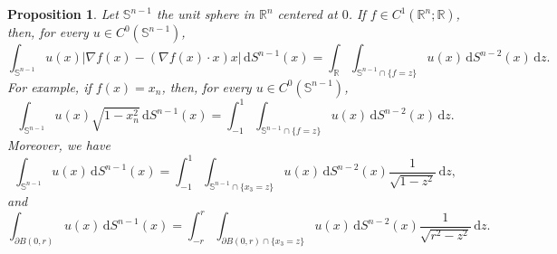 \documentclass[a4paper,9pt]{amsart}
\newcommand{\bb}[1]{\mathbb{#1}}
\newcommand{\R}{\mathbb{R}}	%
\newcommand{\did}{\,\mathrm{d}}	%
\newcommand{\de}{\partial}		%
\newcommand{\grad}{\nabla}
\theoremstyle{plain}
\newtheorem{proposition}{Proposition}[section]
\theoremstyle{definition}
\theoremstyle{remark}
\begin{document}
\begin{proposition}\label{prop67a71b34}
	Let $\bb S^{n-1}$ the unit sphere in $\R^n$ centered at $0$.
	If $f\in C^1(\R^n;\R)$, then, for every $u\in C^0(\bb S^{n-1})$,
	\begin{equation}
		\int_{\bb S^{n-1}} u(x) |\grad f(x)-(\grad f(x)\cdot x)x| \did S^{n-1}(x) 
		= \int_\R \int_{\bb S^{n-1}\cap \{f=z\}} u(x) \did S^{n-2}(x) \did z .
	\end{equation}
	For example, if $f(x) = x_n$, then, for every $u\in C^0(\bb S^{n-1})$,
	\begin{equation}\label{eq67a72eb2}
		\int_{\bb S^{n-1}} u(x) \sqrt{1-x_n^2} \did S^{n-1}(x) 
		= \int_{-1}^1 \int_{\bb S^{n-1}\cap \{f=z\}} u(x) \did S^{n-2}(x) \did z .
	\end{equation}
	Moreover, we have 
	\begin{equation}\label{eq67a72eb7}
		\int_{\bb S^{n-1}} u(x) \did S^{n-1}(x) 
		= \int_{-1}^1 \int_{\bb S^{n-1}\cap \{x_3=z\}} u(x) \did S^{n-2}(x) \frac1{\sqrt{1-z^2}}\did z ,
	\end{equation}
	and
	\begin{equation}\label{eq67a735b3}
		\int_{\de B(0,r)} u(x) \did S^{n-1}(x) 
		= \int_{-r}^r \int_{\de B(0,r)\cap \{x_3=z\}} u(x) \did S^{n-2}(x) \frac1{\sqrt{r^2-z^2}}\did z .
	\end{equation}
\end{proposition}
\end{document}
